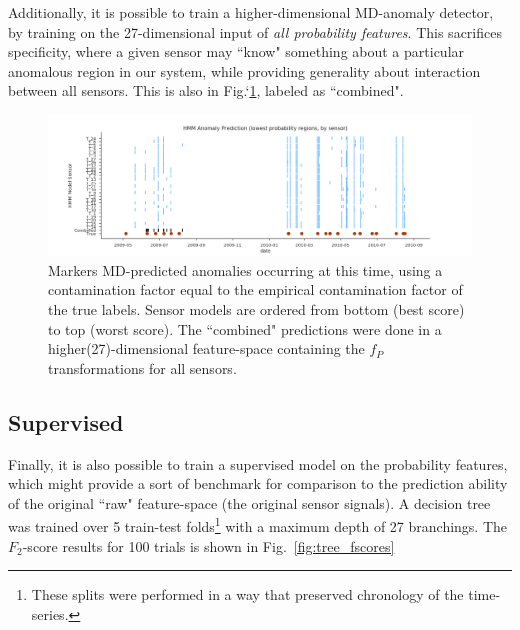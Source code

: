 \documentclass[twocolumn,10pt]{article}
\begin{document}
Additionally, it is possible to train a higher-dimensional MD-anomaly detector, by training on the 27-dimensional input of \textit{all probability features}. This sacrifices specificity, where a given sensor may ``know" something about a particular anomalous region in our system, while providing generality about interaction between all sensors. This is also in Fig.`\ref{fig:unsupervised}, labeled as ``combined".
\begin{figure}
    \centering
    \includegraphics[width=\linewidth]{unsupervised.png}
    \caption{Markers MD-predicted anomalies occurring at this time, using a contamination factor equal to the empirical contamination factor of the true labels. Sensor models are ordered from bottom (best score) to top (worst score). The ``combined" predictions were done in a higher(27)-dimensional feature-space containing the $f_P$ transformations for all sensors.  }
    \label{fig:unsupervised}
\end{figure}

\subsection{Supervised}
Finally, it is also possible to train a supervised model on the probability features, which might provide a sort of benchmark for comparison to the prediction ability of the original ``raw" feature-space (the original sensor signals). A decision tree was trained over 5 train-test folds\footnote{These splits were performed in a way that preserved chronology of the time-series.} with a maximum depth of 27 branchings. The $F_2$-score results for 100 trials is shown in Fig.~\ref{fig:tree_fscores}
\end{document}

